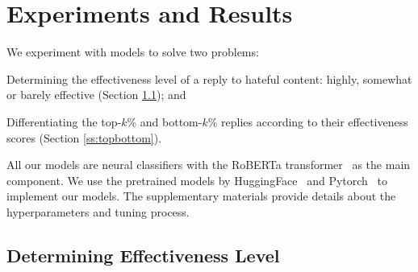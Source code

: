 \documentclass[11pt]{article}
\begin{document}
\section{Experiments and Results} 
\label{s:experiments}

We experiment with models to solve two problems:
\begin{compactitem}
	\item Determining the effectiveness level of a reply to hateful content: highly, somewhat or barely effective (Section \ref{ss:levels}); and
	\item Differentiating the top-$k$\% and bottom-$k$\% replies according to their effectiveness scores (Section \ref{ss:topbottom}).
\end{compactitem}



All our models are neural classifiers with the RoBERTa transformer~\cite{DBLP:journals/corr/abs-1907-11692} as the main component.
We use the pretrained models by HuggingFace~\cite{wolf-etal-2020-transformers}
and Pytorch~\cite{NEURIPS2019_9015} to implement our models.
The supplementary materials provide details about the hyperparameters and tuning process.

\subsection{Determining Effectiveness Level}
\label{ss:levels}
\end{document}
